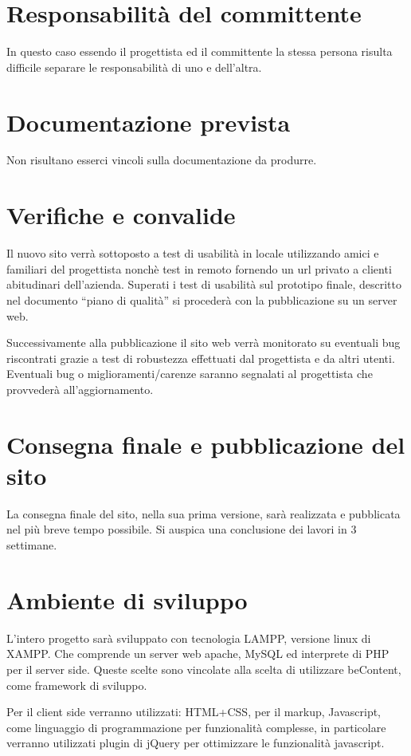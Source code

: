 \documentclass[a4paper,12pt,hidelinks]{report}
\begin{document}
\section{Responsabilità del committente}
  In questo caso essendo il progettista ed il committente la stessa persona risulta difficile separare le responsabilità di uno e dell'altra.

\section{Documentazione prevista}
  Non risultano esserci vincoli sulla documentazione da produrre.

\section{Verifiche e convalide}
  Il nuovo sito verrà sottoposto a test di usabilità in locale utilizzando amici e familiari del progettista nonchè test in remoto fornendo un url privato 
  a clienti abitudinari dell'azienda. Superati i test di usabilità sul prototipo finale, descritto nel documento ``piano di qualità'' si procederà con la pubblicazione 
  su un server web.
  \par Successivamente alla pubblicazione il sito web verrà monitorato su eventuali bug riscontrati grazie a test di robustezza effettuati dal progettista e da altri utenti. 
  \\ Eventuali bug o miglioramenti/carenze saranno segnalati al progettista che provvederà all'aggiornamento.

\section{Consegna finale e pubblicazione del sito}
  La consegna finale del sito, nella sua prima versione, sarà realizzata e pubblicata nel più breve tempo possibile. 
  Si auspica una conclusione dei lavori in 3 settimane.
  
\section{Ambiente di sviluppo}
  L'intero progetto sarà sviluppato con tecnologia LAMPP, versione linux di XAMPP. Che comprende un server web apache, MySQL ed interprete di PHP per il server side. Queste scelte sono vincolate 
  alla scelta di utilizzare beContent, come framework di sviluppo.
  \par Per il client side verranno utilizzati: HTML+CSS, per il markup, Javascript, come linguaggio di programmazione per funzionalità complesse, in particolare verranno utilizzati plugin di 
  jQuery per ottimizzare le funzionalità javascript.
\end{document}

